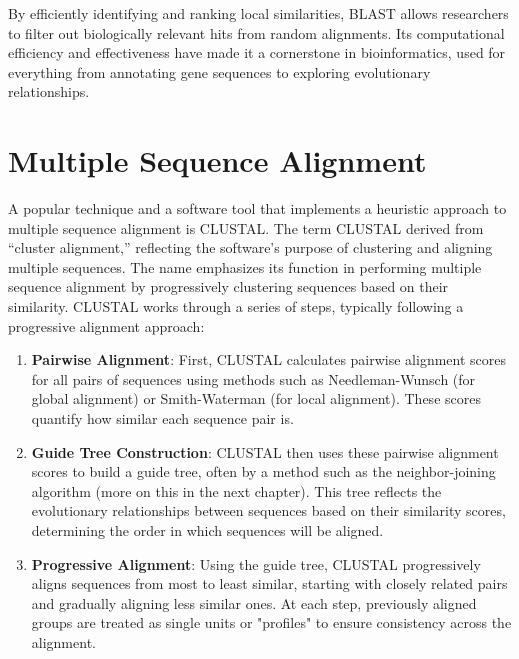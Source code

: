 By efficiently identifying and ranking local similarities, BLAST allows researchers to filter out biologically relevant hits from random alignments. Its computational efficiency and effectiveness have made it a cornerstone in bioinformatics, used for everything from annotating gene sequences to exploring evolutionary relationships.


\section{Multiple Sequence Alignment}

A popular technique and a software tool that implements a heuristic approach to multiple sequence alignment is CLUSTAL. 
The term CLUSTAL derived from ``cluster alignment,'' reflecting the software's purpose of clustering and aligning multiple sequences. The name emphasizes its function in performing multiple sequence alignment by progressively clustering sequences based on their similarity. CLUSTAL works through a series of steps, typically following a progressive alignment approach:

\begin{enumerate}
\item \textbf{Pairwise Alignment}: First, CLUSTAL calculates pairwise alignment scores for all pairs of sequences using methods such as Needleman-Wunsch (for global alignment) or Smith-Waterman (for local alignment). These scores quantify how similar each sequence pair is.
\item \textbf{Guide Tree Construction}: CLUSTAL then uses these pairwise alignment scores to build a guide tree, often by a method such as the neighbor-joining algorithm (more on this in the next chapter). This tree reflects the evolutionary relationships between sequences based on their similarity scores, determining the order in which sequences will be aligned.
\item \textbf{Progressive Alignment}: Using the guide tree, CLUSTAL progressively aligns sequences from most to least similar, starting with closely related pairs and gradually aligning less similar ones. At each step, previously aligned groups are treated as single units or "profiles" to ensure consistency across the alignment.
\end{enumerate}

